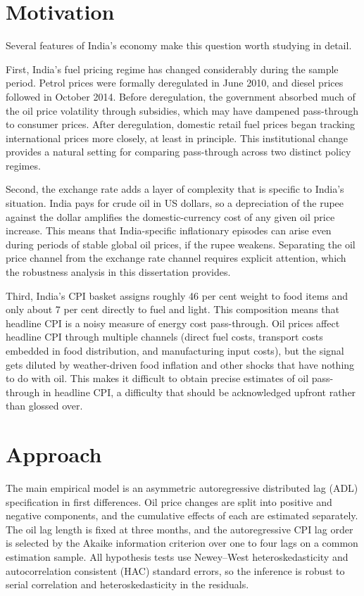 \section{Motivation}

Several features of India's economy make this question worth studying in detail.

First, India's fuel pricing regime has changed considerably during the sample period. Petrol prices were formally deregulated in June 2010, and diesel prices followed in October 2014. Before deregulation, the government absorbed much of the oil price volatility through subsidies, which may have dampened pass-through to consumer prices. After deregulation, domestic retail fuel prices began tracking international prices more closely, at least in principle. This institutional change provides a natural setting for comparing pass-through across two distinct policy regimes.

Second, the exchange rate adds a layer of complexity that is specific to India's situation. India pays for crude oil in US dollars, so a depreciation of the rupee against the dollar amplifies the domestic-currency cost of any given oil price increase. This means that India-specific inflationary episodes can arise even during periods of stable global oil prices, if the rupee weakens. Separating the oil price channel from the exchange rate channel requires explicit attention, which the robustness analysis in this dissertation provides.

Third, India's CPI basket assigns roughly 46 per cent weight to food items and only about 7 per cent directly to fuel and light. This composition means that headline CPI is a noisy measure of energy cost pass-through. Oil prices affect headline CPI through multiple channels (direct fuel costs, transport costs embedded in food distribution, and manufacturing input costs), but the signal gets diluted by weather-driven food inflation and other shocks that have nothing to do with oil. This makes it difficult to obtain precise estimates of oil pass-through in headline CPI, a difficulty that should be acknowledged upfront rather than glossed over.

\section{Approach}

The main empirical model is an asymmetric autoregressive distributed lag (ADL) specification in first differences. Oil price changes are split into positive and negative components, and the cumulative effects of each are estimated separately. The oil lag length is fixed at three months, and the autoregressive CPI lag order is selected by the Akaike information criterion over one to four lags on a common estimation sample. All hypothesis tests use Newey--West heteroskedasticity and autocorrelation consistent (HAC) standard errors, so the inference is robust to serial correlation and heteroskedasticity in the residuals.

